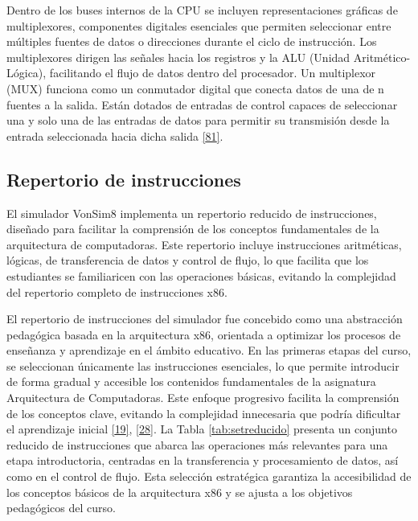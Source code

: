 \documentclass[12pt,oneside]{templates/unerthesis}
\begin{document}
Dentro de los buses internos de la CPU se incluyen representaciones gráficas de multiplexores, componentes digitales esenciales que permiten seleccionar entre múltiples fuentes de datos o direcciones durante el ciclo de instrucción. Los multiplexores dirigen las señales hacia los registros y la ALU (Unidad Aritmético-Lógica), facilitando el flujo de datos dentro del procesador. Un multiplexor (MUX) funciona como un conmutador digital que conecta datos de una de n fuentes a la salida. Están dotados de entradas de control capaces de seleccionar una y solo una de las entradas de datos para permitir su transmisión desde la entrada seleccionada hacia dicha salida \protect\hyperlink{ref-mano2017digital}{{[}81{]}}.

\hypertarget{repertorio-de-instrucciones-1}{%
\subsection{Repertorio de instrucciones}\label{repertorio-de-instrucciones-1}}

El simulador VonSim8 implementa un repertorio reducido de instrucciones, diseñado para facilitar la comprensión de los conceptos fundamentales de la arquitectura de computadoras. Este repertorio incluye instrucciones aritméticas, lógicas, de transferencia de datos y control de flujo, lo que facilita que los estudiantes se familiaricen con las operaciones básicas, evitando la complejidad del repertorio completo de instrucciones x86.

El repertorio de instrucciones del simulador fue concebido como una abstracción pedagógica basada en la arquitectura x86, orientada a optimizar los procesos de enseñanza y aprendizaje en el ámbito educativo. En las primeras etapas del curso, se seleccionan únicamente las instrucciones esenciales, lo que permite introducir de forma gradual y accesible los contenidos fundamentales de la asignatura Arquitectura de Computadoras. Este enfoque progresivo facilita la comprensión de los conceptos clave, evitando la complejidad innecesaria que podría dificultar el aprendizaje inicial \protect\hyperlink{ref-hennessy2017computer}{{[}19{]}}, \protect\hyperlink{ref-tanenbaum_structured_2016}{{[}28{]}}. La Tabla \ref{tab:setreducido} presenta un conjunto reducido de instrucciones que abarca las operaciones más relevantes para una etapa introductoria, centradas en la transferencia y procesamiento de datos, así como en el control de flujo. Esta selección estratégica garantiza la accesibilidad de los conceptos básicos de la arquitectura x86 y se ajusta a los objetivos pedagógicos del curso.
\end{document}
